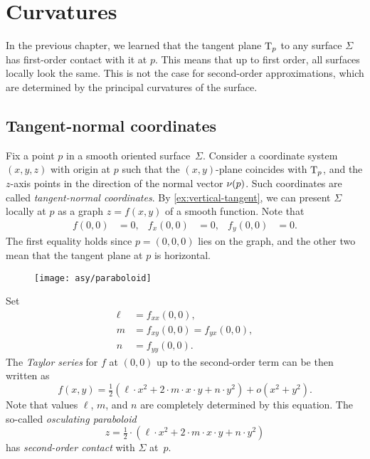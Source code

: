 \chapter{Curvatures}
\label{chap:surface-curvature}

In the previous chapter, we learned that the tangent plane $\mathrm{T}_p$ to any surface $\Sigma$ has first-order contact with it at $p$.
This means that up to first order, all surfaces locally look the same.
This is not the case for second-order approximations, which are determined by the principal curvatures of the surface.

\section{Tangent-normal coordinates} \label{sec:lmn}

Fix a point $p$ in a smooth oriented surface~$\Sigma$.
Consider a coordinate system $(x,y,z)$ with origin at $p$ such that the $(x,y)$-plane coincides with $\mathrm{T}_p$, and the $z$-axis points in the direction of the normal vector $\nu(p)$. Such coordinates are called \emph{tangent-normal coordinates}. 
By \ref{ex:vertical-tangent}, we can present $\Sigma$ locally at $p$ as a graph $z=f(x,y)$ of a smooth function. 
Note that 
\begin{align*}
f(0,0)&=0,
&
f_x(0,0)&=0,
&
f_y(0,0)&=0.
\end{align*}
The first equality holds since $p=(0,0,0)$ lies on the graph, and the other two mean that the tangent plane at $p$ is horizontal.


\begin{wrapfigure}[7]{o}{42 mm}
\vskip-4mm
\centering
\texttt{[image: asy/paraboloid]}
\vskip-3mm
\end{wrapfigure}

Set 
\begin{align*}
\ell&=f_{xx}(0,0),
\\
m&=f_{xy}(0,0)=f_{yx}(0,0),
\\
n&=f_{yy}(0,0).
\end{align*}
The \textit{Taylor series} 
for $f$ at $(0,0)$ up to the second-order term can be then written as
\[f(x,y)=\tfrac12(\ell\cdot x^2+2\cdot m\cdot x\cdot y+n\cdot y^2)+o(x^2+y^2).\]
Note that values $\ell$, $m$, and $n$ are completely determined by this equation.
The so-called \emph{osculating paraboloid}
\[z=\tfrac12\cdot(\ell\cdot x^2+2\cdot m\cdot x\cdot y+n\cdot y^2)\]
has \emph{second-order contact} with $\Sigma$ at~$p$.


